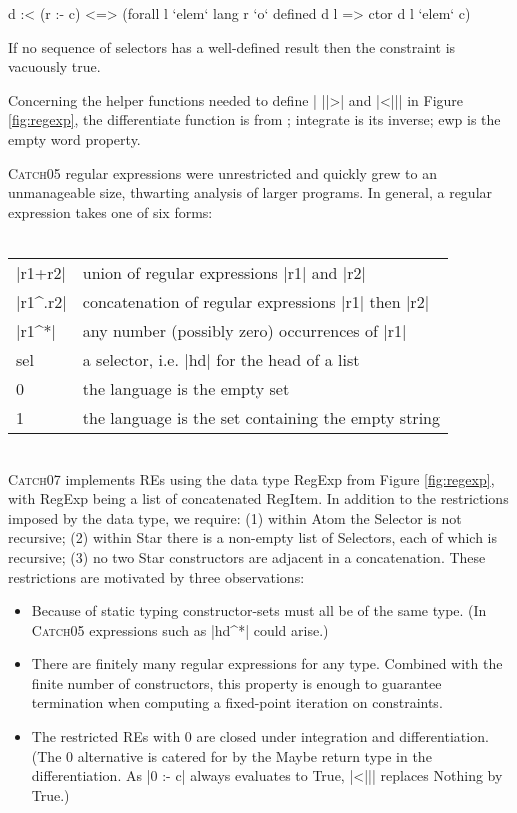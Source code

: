 \documentclass[preprint]{sigplanconf}
\newcommand{\C}[1]{\textsf{#1}}
\newcommand{\catch}{\textsc{Catch}}
\newcommand{\newtool}{\catch07}
\newcommand{\oldtool}{\catch05}
\newcommand{\ignore}{}
\begin{document}
\ignore\begin{code}
d :< (r :- c) <=> (forall l `elem` lang r `o` defined d l => ctor d l `elem` c)
\end{code}

If no sequence of selectors has a well-defined result then the constraint is vacuously true.

Concerning the helper functions needed to define | ||>| and |<||| in Figure \ref{fig:regexp}, the \C{differentiate} function is from \citet{conway:regexp}; \C{integrate} is its inverse; \C{ewp} is the empty word property.

\oldtool{} regular expressions were unrestricted and quickly grew to an unmanageable size, thwarting analysis of larger programs. In general, a regular expression takes one of six forms:\\ \\
\begin{tabular}{ll}
|r1+r2|  & union of regular expressions |r1| and |r2| \\
\ignore|r1^.r2| & concatenation of regular expressions |r1| then |r2| \\
\ignore|r1^*|   & any number (possibly zero) occurrences of |r1| \\
\C{sel}  & a selector, i.e. |hd| for the head of a list \\
0        & the language is the empty set \\
1        & the language is the set containing the empty string
\end{tabular} \\

\newtool{} implements REs using the data type \C{RegExp} from Figure \ref{fig:regexp}, with \C{RegExp} being a list of concatenated \C{RegItem}. In addition to the restrictions imposed by the data type, we require: (1) within \C{Atom} the \C{Selector} is not recursive; (2) within \C{Star} there is a non-empty list of \C{Selector}s, each of which is recursive; (3) no two \C{Star} constructors are adjacent in a concatenation. These restrictions are motivated by three observations:

\begin{itemize}
\item Because of static typing constructor-sets must all be of the same type. (In \oldtool{} expressions such as \ignore|hd^*| could arise.)

\item There are finitely many regular expressions for any type. Combined with the finite number of constructors, this property is enough to guarantee termination when computing a fixed-point iteration on constraints.

\item The restricted REs with 0 are closed under integration and differentiation. (The 0 alternative is catered for by the \C{Maybe} return type in the differentiation. As \ignore|0 :- c| always evaluates to True, |<||| replaces \C{Nothing} by True.)
\end{itemize}
\end{document}
